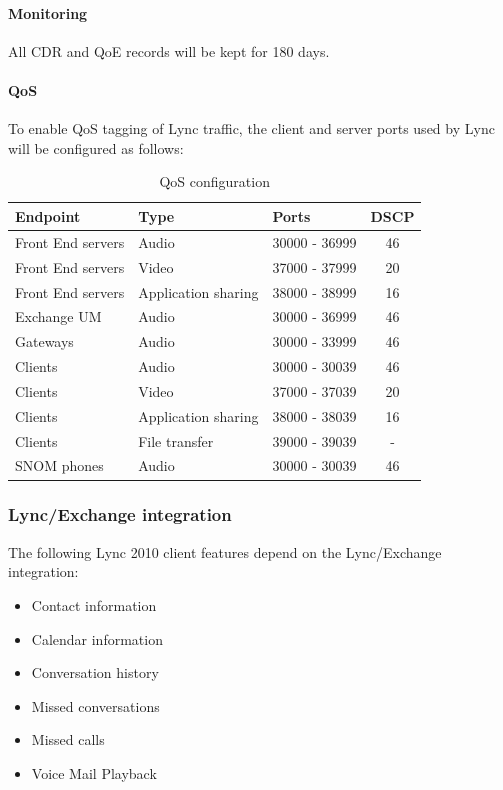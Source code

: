 		\paragraph{Monitoring} All CDR and QoE records will be kept for 180 days.
		
		\paragraph{QoS} To enable QoS tagging of Lync traffic, the client and server ports used by Lync will be configured as follows:

		\begin{table}[H]
		\centering
		\begin{tabular}{lllc}
			Endpoint & Type & Ports & DSCP  \\ \hline 
			Front End servers & Audio & 30000 - 36999 & 46 \\
			Front End servers & Video & 37000 - 37999 & 20 \\
			Front End servers & Application sharing & 38000 - 38999 & 16 \\
			Exchange UM & Audio & 30000 - 36999 & 46 \\
			Gateways & Audio & 30000 - 33999 & 46 \\
			Clients & Audio & 30000 - 30039 & 46 \\
			Clients & Video & 37000 - 37039 & 20 \\
			Clients & Application sharing & 38000 - 38039 & 16 \\
			Clients & File transfer & 39000 - 39039 & - \\
			SNOM phones & Audio & 30000 - 30039 & 46 \\
		\end{tabular}
		\caption{\label{tab:case_qos} QoS configuration}
		\end{table}
	
	
	\subsubsection{Lync/Exchange integration}
	The following Lync 2010 client features depend on the Lync/Exchange integration:
	\begin{itemize}
		\item Contact information
		\item Calendar information
		\item Conversation history
		\item Missed conversations
		\item Missed calls
		\item Voice Mail Playback
	\end{itemize}


